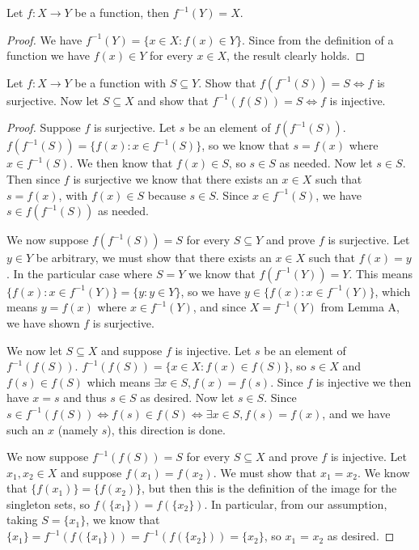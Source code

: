 \documentclass[12pt]{article}
\newenvironment{lemma}[2][Lemma]{\begin{trivlist}
\item[\hskip \labelsep {\bfseries #1}\hskip \labelsep {\bfseries #2}]}{\end{trivlist}}
\newenvironment{exercise}[2][Exercise]{\begin{trivlist}
\item[\hskip \labelsep {\bfseries #1}\hskip \labelsep {\bfseries #2}]}{\end{trivlist}}
\begin{document}
\begin{lemma}{A}
	Let $ f : X \to Y $ be a function, then $ f^{-1}(Y) = X $.
\end{lemma}
\begin{proof}
	We have $ f^{-1}(Y) = \{ x \in X : f(x) \in Y \} $.
	Since from the definition of a function we have $ f(x) \in Y $ for every $ x \in X $, the result clearly holds.
\end{proof}

\begin{exercise}{3.4.5}
	Let $ f : X \to Y $ be a function with $ S \subseteq Y $.
	Show that $ f(f^{-1}(S)) = S \iff f $ is surjective.
	Now let $ S \subseteq X $ and show that $ f^{-1}(f(S)) = S \iff f $ is injective.
\end{exercise}
\begin{proof}
	Suppose $ f $ is surjective.
	Let $ s $ be an element of $ f(f^{-1}(S)) $.
	$ f(f^{-1}(S)) = \{ f(x) : x \in f^{-1}(S) \} $, so we know that $ s = f(x) $ where $ x \in f^{-1}(S) $.
	We then know that $ f(x) \in S $, so $ s \in S $ as needed.
	Now let $ s \in S $.
	Then since $ f $ is surjective we know that there exists an $ x \in X $ such that $ s = f(x) $, with $ f(x) \in S $ because $ s \in S $.
	Since $ x \in f^{-1}(S) $, we have $ s \in f(f^{-1}(S)) $ as needed.
	
	We now suppose $ f(f^{-1}(S)) = S $ for every $ S \subseteq Y $ and prove $ f $ is surjective.
	Let $ y \in Y $ be arbitrary, we must show that there exists an $ x \in X $ such that $ f(x) = y $.
	In the particular case where $ S = Y $ we know that $ f(f^{-1}(Y)) = Y $.
	This means $ \{ f(x) : x \in f^{-1}(Y) \} = \{ y : y \in Y \} $, so we have $ y \in \{ f(x) : x \in f^{-1}(Y) \} $, which means $ y = f(x) $ where $ x \in f^{-1}(Y) $, and since $ X = f^{-1}(Y) $ from Lemma A, we have shown $ f $ is surjective.
	
	We now let $ S \subseteq X $ and suppose $ f $ is injective.
	Let $ s $ be an element of $ f^{-1}(f(S)) $.
	$ f^{-1}(f(S)) = \{ x \in X : f(x) \in f(S) \} $, so $ s \in X $ and $ f(s) \in f(S) $ which means $ \exists x \in S, f(x) = f(s) $.
	Since $ f $ is injective we then have $ x = s $ and thus $ s \in S $ as desired.
	Now let $ s \in S $.
	Since $ s \in f^{-1}(f(S)) \iff f(s) \in f(S) \iff \exists x \in S, f(s) = f(x) $, and we have such an $ x $ (namely $ s $), this direction is done.
	
	We now suppose $ f^{-1}(f(S)) = S $ for every $ S \subseteq X $ and prove $ f $ is injective.
	Let $ x_{1}, x_{2} \in X $ and suppose $ f(x_{1}) = f(x_{2}) $.
	We must show that $ x_{1} = x_{2} $.
	We know that $ \{ f(x_{1}) \} = \{ f(x_{2}) \} $, but then this is the definition of the image for the singleton sets, so $ f(\{ x_{1} \}) = f(\{ x_{2} \}) $.
	In particular, from our assumption, taking $ S = \{ x_{1} \} $, we know that $ \{ x_{1} \} = f^{-1}(f(\{ x_{1} \})) = f^{-1}(f(\{ x_{2} \})) = \{ x_{2} \} $, so $ x_{1} $ = $ x_{2} $ as desired.
\end{proof}
\end{document}
